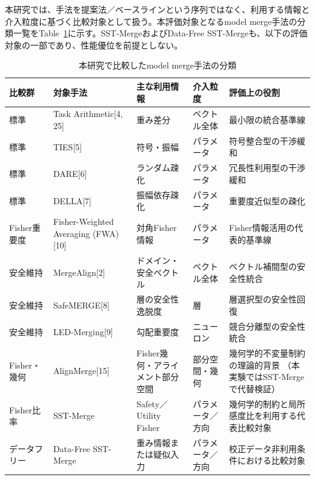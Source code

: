 \documentclass{article}
\begin{document}
本研究では、手法を提案法／ベースラインという序列ではなく、利用する情報と介入粒度に基づく比較対象として扱う。本評価対象となるmodel merge手法の分類一覧をTable~\ref{tab:baseline_methods}に示す。SST-MergeおよびData-Free SST-Mergeも、以下の評価対象の一部であり、性能優位を前提としない。
\begin{table}[t]
\centering
\caption{本研究で比較したmodel merge手法の分類}
\label{tab:baseline_methods}
\small
\begin{tabular}{p{1.8cm}p{2.6cm}p{2.8cm}p{2.3cm}p{4.3cm}}
\toprule
比較群 & 対象手法 & 主な利用情報 & 介入粒度 & 評価上の役割 \\
\midrule

標準 & Task Arithmetic[4, 25] & 重み差分 & ベクトル全体 & 最小限の統合基準線 \\

標準 & TIES[5] & 符号・振幅 & パラメータ & 符号整合型の干渉緩和 \\

標準 & DARE[6] & ランダム疎化 & パラメータ & 冗長性利用型の干渉緩和 \\

標準 & DELLA[7] & 振幅依存疎化 & パラメータ & 重要度近似型の疎化 \\

Fisher重要度 & Fisher-Weighted Averaging (FWA)[10] & 対角Fisher情報 & パラメータ & Fisher情報活用の代表的基準線 \\

安全維持 & MergeAlign[2] & ドメイン・安全ベクトル & ベクトル全体 & ベクトル補間型の安全性統合 \\

安全維持 & SafeMERGE[8] & 層の安全性逸脱度 & 層 & 層選択型の安全性回復 \\

安全維持 & LED-Merging[9] & 勾配重要度 & ニューロン & 競合分離型の安全性統合 \\

Fisher・幾何 & AlignMerge[15] & Fisher幾何・アライメント部分空間 & 部分空間・幾何 & 幾何学的不変量制約の理論的背景
（本実験ではSST-Mergeで代替検証） \\

Fisher比率 & SST-Merge & Safety／Utility Fisher & パラメータ／方向 & 幾何学的制約と局所感度比を利用する代表比較対象 \\

データフリー & Data-Free SST-Merge & 重み情報または疑似入力 & パラメータ／方向 & 校正データ非利用条件における比較対象 \\
\bottomrule
\end{tabular}
\end{table}
\end{document}
